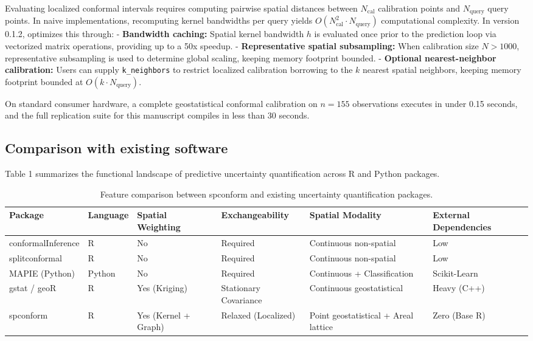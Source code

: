 Evaluating localized conformal intervals requires computing pairwise spatial distances between \(N_{\text{cal}}\) calibration points and \(N_{\text{query}}\) query points. In naive implementations, recomputing kernel bandwidths per query yields \(O(N_{\text{cal}}^2 \cdot N_{\text{query}})\) computational complexity. In version 0.1.2,  optimizes this through:
- \textbf{Bandwidth caching:} Spatial kernel bandwidth \(h\) is evaluated once prior to the prediction loop via vectorized matrix operations, providing up to a 50x speedup.
- \textbf{Representative spatial subsampling:} When calibration size \(N > 1000\), representative subsampling is used to determine global scaling, keeping memory footprint bounded.
- \textbf{Optional nearest-neighbor calibration:} Users can supply \texttt{k\_neighbors} to restrict localized calibration borrowing to the \(k\) nearest spatial neighbors, keeping memory footprint bounded at \(O(k \cdot N_{\text{query}})\).

On standard consumer hardware, a complete geostatistical conformal calibration on \(n = 155\) observations executes in under 0.15 seconds, and the full replication suite for this manuscript compiles in less than 30 seconds.

\subsection{Comparison with existing software}\label{comparison-with-existing-software}

Table 1 summarizes the functional landscape of predictive uncertainty quantification across R and Python packages.

\begin{table}

\caption{\label{tab:tab-comparison}Feature comparison between spconform and existing uncertainty quantification packages.}
\centering
\begin{tabular}[t]{l|l|l|l|l|l}
\hline
Package & Language & Spatial Weighting & Exchangeability & Spatial Modality & External Dependencies\\
\hline
conformalInference & R & No & Required & Continuous non-spatial & Low\\
\hline
splitconformal & R & No & Required & Continuous non-spatial & Low\\
\hline
MAPIE (Python) & Python & No & Required & Continuous + Classification & Scikit-Learn\\
\hline
gstat / geoR & R & Yes (Kriging) & Stationary Covariance & Continuous geostatistical & Heavy (C++)\\
\hline
spconform & R & Yes (Kernel + Graph) & Relaxed (Localized) & Point geostatistical + Areal lattice & Zero (Base R)\\
\hline
\end{tabular}
\end{table}


